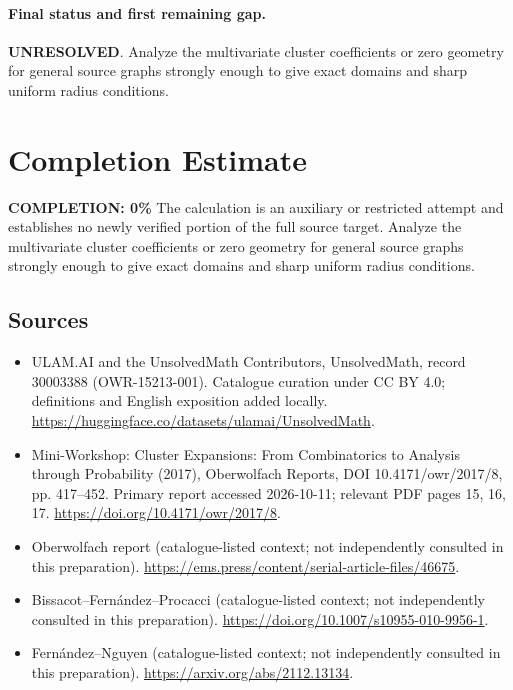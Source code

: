 \documentclass[11pt]{article}
\begin{document}
\paragraph{Final status and first remaining gap.}
\textbf{UNRESOLVED}. Analyze the multivariate cluster coefficients or zero geometry for general source graphs strongly enough to give exact domains and sharp uniform radius conditions.

\section{Completion Estimate}
\noindent\textbf{COMPLETION: 0\%}
The calculation is an auxiliary or restricted attempt and establishes no newly verified portion of the full source target. Analyze the multivariate cluster coefficients or zero geometry for general source graphs strongly enough to give exact domains and sharp uniform radius conditions.

\subsection{Sources}
\begin{itemize}
\item[\hypertarget{source:30003388:1}{S1}] ULAM.AI and the UnsolvedMath Contributors, UnsolvedMath, record 30003388 (OWR-15213-001). Catalogue curation under CC BY 4.0; definitions and English exposition added locally.
\url{https://huggingface.co/datasets/ulamai/UnsolvedMath}.
\item[\hypertarget{source:30003388:2}{S2}] Mini-Workshop: Cluster Expansions: From Combinatorics to Analysis through Probability (2017), Oberwolfach Reports, DOI 10.4171/owr/2017/8, pp. 417--452. Primary report accessed 2026-10-11; relevant PDF pages 15, 16, 17.
\url{https://doi.org/10.4171/owr/2017/8}.
\item[\hypertarget{source:30003388:3}{S3}] Oberwolfach report (catalogue-listed context; not independently consulted in this preparation).
\url{https://ems.press/content/serial-article-files/46675}.
\item[\hypertarget{source:30003388:4}{S4}] Bissacot--Fernández--Procacci (catalogue-listed context; not independently consulted in this preparation).
\url{https://doi.org/10.1007/s10955-010-9956-1}.
\item[\hypertarget{source:30003388:5}{S5}] Fernández--Nguyen (catalogue-listed context; not independently consulted in this preparation).
\url{https://arxiv.org/abs/2112.13134}.
\end{itemize}
\label{end:30003388}
\end{document}
